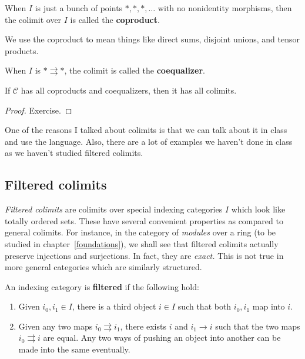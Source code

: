 \begin{definition} 
When $I$ is just a bunch of points  $\ast, \ast, \ast, \dots$ with no nonidentity morphisms, then the
colimit over $I$ is called the \textbf{coproduct}.
\end{definition} 

We use the coproduct to mean things like direct sums, disjoint unions, and
tensor products. 

\begin{definition} 
When $I$ is $\ast \rightrightarrows \ast$, the colimit is called the
\textbf{coequalizer}.
\end{definition} 

\begin{theorem} 
If $\mathcal{C}$ has all coproducts and coequalizers, then it has all colimits. 
\end{theorem} 

\begin{proof} 
Exercise.  \end{proof} 

One of the reasons I talked about colimits is that we can talk about it in
class and use the language. Also, there are a lot of examples we haven't done
in class as we haven't studied filtered colimits.

\subsection{Filtered colimits}


\emph{Filtered colimits} are colimits
over special indexing categories $I$ which look like totally ordered sets.
These have several convenient properties as compared to general colimits.
For instance, in the category of \emph{modules} over a ring (to be studied in
chapter~\ref{foundations}), we shall see that filtered colimits actually
preserve injections and surjections. In fact, they are \emph{exact.} This is
not true in more general categories which are similarly structured.



\begin{definition} 
An indexing category is \textbf{filtered} if the following hold:
\begin{enumerate}
\item Given $i_0, i_1 \in I$, there is a third object $i \in I$ such that both
$i_0, i_1$ map into $i$. 
\item Given any two maps $i_0 \rightrightarrows i_1$, there exists $i$ and $i_1
\to i$ such that the two maps $i_0 \rightrightarrows i$ are equal. Any two ways
of pushing an object into another can be made into the same eventually. 
\end{enumerate}
\end{definition} 

